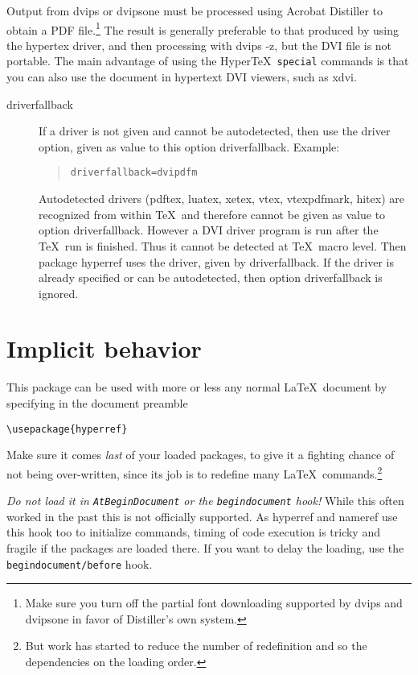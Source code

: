 \documentclass{article}
\newcommand*{\xpackage}[1]{\textsf{#1}}
\newcommand{\bs}{\symbol{'134}}%
\newcommand{\ci}[1]{\texttt{\bs#1}}
\begin{document}
Output from \textsf{dvips} or \textsf{dvipsone} must be processed using
Acrobat Distiller to obtain a PDF file.\footnote{Make sure you turn off
the partial font downloading supported by \textsf{dvips} and
\textsf{dvipsone} in favor of Distiller's own system.} The result is
generally preferable to that produced by using the \textsf{hypertex}
driver, and then processing with \textsf{dvips -z}, but the DVI file is
not portable. The main advantage of using the Hyper\TeX\ \ci{special}
commands is that you can also use the document in hypertext DVI viewers,
such as \textsf{xdvi}.

\begin{description}
\item[driverfallback]
  If a driver is not given and cannot be autodetected, then use
  the driver option, given as value to this option \textsf{driverfallback}.
  Example:
  \begin{quote}
    \texttt{driverfallback=dvipdfm}
  \end{quote}
  Autodetected drivers (\textsf{pdftex}, \textsf{luatex}, \textsf{xetex}, \textsf{vtex},
  \textsf{vtexpdfmark}, \textsf{hitex}) are recognized from within \TeX\ and
  therefore cannot be given as value to option \textsf{driverfallback}.
  However a DVI driver program is run after the \TeX\ run is finished.
  Thus it cannot be detected at \TeX\ macro level. Then package
  \xpackage{hyperref}
  uses the driver, given by \textsf{driverfallback}. If the driver
  is already specified or can be autodetected, then option
  \textsf{driverfallback} is ignored.
\end{description}

\section{Implicit behavior}

This package can be used with more or less any normal \LaTeX\ document
by specifying in the document preamble

\begin{verbatim}
\usepackage{hyperref}
\end{verbatim}

Make sure it comes \emph{last} of your loaded packages, to give it a
fighting chance of not being over-written, since its job is to redefine
many \LaTeX\ commands.\footnote{But work has started to reduce the
number of redefinition and so the dependencies on the loading order.}

\emph{Do not load it in \ci{AtBeginDocument} or the \texttt{begindocument} hook!}
While this often worked in the past this is not officially supported.
As \xpackage{hyperref} and \xpackage{nameref} use this hook too to initialize commands,
timing of code execution is tricky and fragile if the packages are loaded there.
If you want to delay the loading, use the \texttt{begindocument/before} hook.
\end{document}
